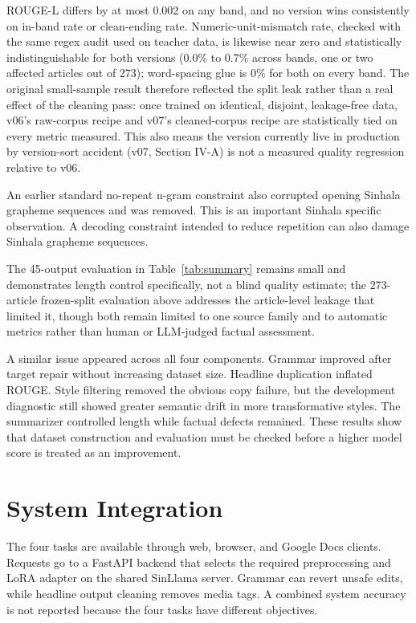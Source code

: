 \documentclass[a4paper,conference]{IEEEtran}
\begin{document}
ROUGE-L differs by at most 0.002 on any band, and no version wins
consistently on in-band rate or clean-ending rate. Numeric-unit-mismatch
rate, checked with the same regex audit used on teacher data, is likewise
near zero and statistically indistinguishable for both versions (0.0\% to
0.7\% across bands, one or two affected articles out of 273); word-spacing
glue is 0\% for both on every band. The original small-sample result
therefore reflected the split leak rather than a real effect of the
cleaning pass: once trained on identical, disjoint, leakage-free data,
v06's raw-corpus recipe and v07's cleaned-corpus recipe are statistically
tied on every metric measured. This also means the version currently live
in production by version-sort accident (v07, Section IV-A) is not a
measured quality regression relative to v06.

An earlier standard no-repeat n-gram
constraint also corrupted opening Sinhala grapheme sequences and was removed.
This is an important Sinhala specific observation. A decoding constraint intended to
reduce repetition can also damage Sinhala grapheme sequences.

The 45-output evaluation in Table~\ref{tab:summary} remains small and
demonstrates length control specifically, not a blind quality estimate; the
273-article frozen-split evaluation above addresses the article-level
leakage that limited it, though both remain limited to one source family
and to automatic metrics rather than human or LLM-judged factual
assessment.

A similar issue appeared across all four components. Grammar improved after
target repair without increasing dataset size. Headline duplication inflated
ROUGE. Style filtering removed the obvious copy failure, but the development
diagnostic still showed greater semantic drift in more transformative styles.
The summarizer controlled length while factual defects remained. These results
show that dataset construction and evaluation must be checked before a higher
model score is treated as an improvement.

\section{System Integration}
The four tasks are available through web, browser, and Google Docs clients.
Requests go to a FastAPI backend that selects the required preprocessing and
LoRA adapter on the shared SinLlama server. Grammar can revert unsafe edits,
while headline output cleaning removes media tags. A combined system accuracy
is not reported because the four tasks have different objectives.
\end{document}
